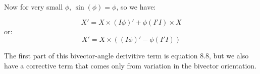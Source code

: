 \documentclass{article}      %
\newcommand{\Sin}[1]{\sin{\left({#1}\right)}}
\begin{document}
Now for very small $\phi$, $\Sin{\phi} = \phi$, so we have:

\[
X' = X \times (I \phi)' + \phi ( I'I ) \times X
\]
or:
\[
X' = X \times \left( (I \phi)' - \phi ( I'I ) \right)
\]

The first part of this bivector-angle derivitive term is equation 8.8, but we also have a corrective term that comes only from variation in the bivector orientation.

\end{document}
